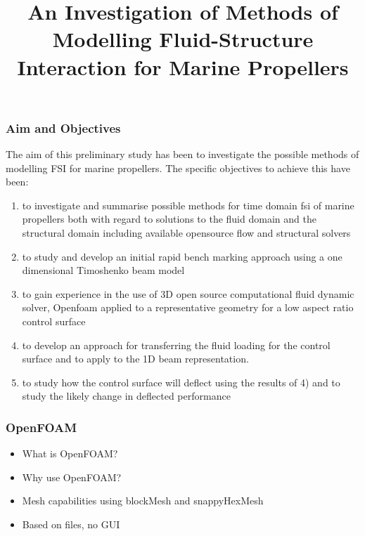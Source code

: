 \documentclass{beamer}
\begin{document}
	\title{An Investigation of Methods of Modelling Fluid-Structure Interaction for Marine Propellers}
	\frame{\titlepage}
	\begin{frame}
		\frametitle{Aim and Objectives}
		The aim of this preliminary study has been to investigate the possible methods of modelling FSI for marine propellers. The specific objectives to achieve this have been:
		\begin{enumerate}
			\small
			\item to investigate and summarise possible methods for time domain fsi of marine propellers both with regard to solutions to the fluid domain and the structural domain including available opensource flow and structural solvers
			\item to study and develop an initial rapid bench marking approach using a one dimensional Timoshenko beam model
			\item to gain experience in the use of 3D open source computational fluid dynamic solver, Openfoam applied to a representative geometry for a low aspect ratio control surface
			\item to develop an approach for transferring the fluid loading for the control surface and to apply to the 1D beam representation.
			\item to study how the control surface will deflect using the results of 4) and to study the likely change in deflected performance
		\end{enumerate}
	\end{frame}
	\begin{frame}
		\frametitle{OpenFOAM}

		\begin{itemize}
			\item What is OpenFOAM?
			\item Why use OpenFOAM?
			\item Mesh capabilities using blockMesh and snappyHexMesh
			\item Based on files, no GUI
			\end{itemize}
		
	\end{frame}
\end{document}
